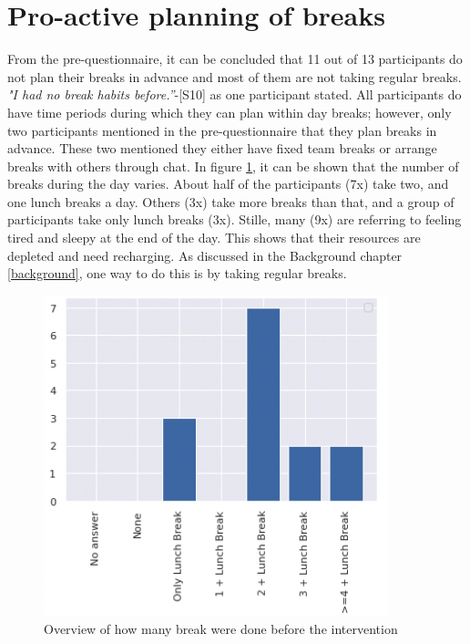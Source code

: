 \documentclass{hasel_thesis}
\begin{document}
\section{Pro-active planning of breaks} \label{planning_breaks}

From the pre-questionnaire, it can be concluded that 11 out of 13 participants do not plan their breaks in advance and most of them are not taking regular breaks. \textit{"I had no break habits before.”}-[S10] as one participant stated. All participants do have time periods during which they can plan within day breaks; however, only two participants mentioned in the pre-questionnaire that they plan breaks in advance. These two mentioned they either have fixed team breaks or arrange breaks with others through chat. In figure \ref{fig:number_breaks_prestudy}, it can be shown that the number of breaks during the day varies. About half of the participants (7x) take two, and one lunch breaks a day. Others (3x) take more breaks than that, and a group of participants take only lunch breaks (3x). Stille, many (9x) are referring to feeling tired and sleepy at the end of the day. This shows that their resources are depleted and need recharging. As discussed in the Background chapter \ref{background}, one way to do this is by taking regular breaks.

\begin{figure}[htp]
    \centering
    \includegraphics[width=10cm]{hasel_thesis/images/number_breaks_prestudy.png}
    \caption{Overview of how many break were done before the intervention}
    \label{fig:number_breaks_prestudy}
\end{figure}
\end{document}
